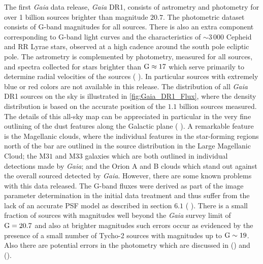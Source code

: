 The first \textit{Gaia} data release, \textit{Gaia} DR1, consists of astrometry and photometry for over 1 billion sources brighter than magnitude $20.7$. The photometric dataset consists of G-band magnitudes for all sources. There is also an extra component corresponding to G-band light curves and the characteristics of $\sim 3\,000$ Cepheid and RR Lyrae stars, observed at a high cadence around the south pole ecliptic pole. The astrometry is complemented by photometry, measured for all sources, and spectra collected for stars brighter than $\textnormal{G}\approx17$ which serve primarily to determine radial velocities of the sources ( \citeyear{2016A&A...595A...2G}). In particular sources with extremely blue or red colors are not available in this release. The distribution of all \textit{Gaia} DR1 sources on the sky is illustrated in \autoref{fig:Gaia_DR1_Flux}, where the density distribution is based on the accurate position of the $1.1$ billion sources measured. The details of this all-sky map can be appreciated in particular in the very fine outlining of the dust features along the Galactic plane ( \citeyear{2016A&A...595A...2G}). A remarkable feature is the Magellanic clouds, where the individual features in the star-forming regions north of the bar are outlined in the source distribution in the Large Magellanic Cloud; the M$31$ and M$33$ galaxies which are both outlined in individual detections made by \textit{Gaia}; and the Orion A and B clouds which stand out against the overall sourced detected by \textit{Gaia}. However, there are some known problems with this data released. The G-band fluxes were derived as part of the image parameter determination in the initial data treatment and thus suffer from the lack of an accurate PSF model as described in section $6.1$ ( \citeyear{2016A&A...595A...2G}). There is a small fraction of sources with magnitudes well beyond the \textit{Gaia} survey limit of $\textnormal{G} = 20.7$ and also at brighter magnitudes such errors occur as evidenced by the presence of a small number of Tycho-2 sources with magnitudes up to $\textnormal{G} \sim 19$. Also there are potential errors in the photometry which are discussed in  (\citeyear{2017A&A...600A..51E}) and  (\citeyear{2017A&A...599A..50A}). \\    

